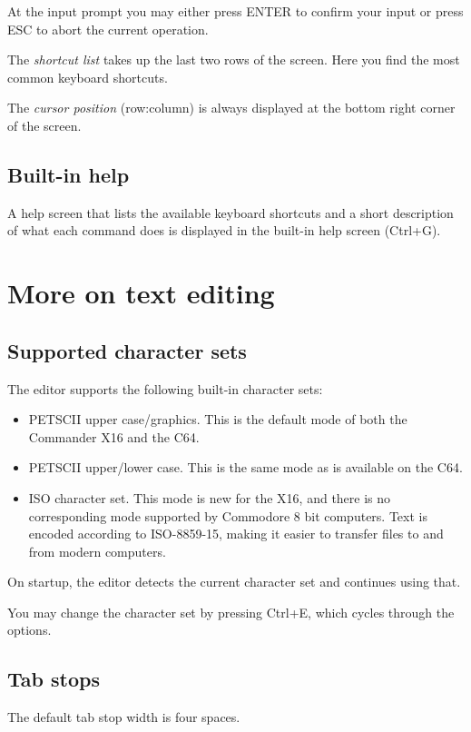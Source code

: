 \documentclass{article}
\begin{document}
        At the input prompt you may either press ENTER to confirm your input or press ESC 
        to abort the current operation.

        The \textit{shortcut list} takes up the last two rows of the screen. Here you find
        the most common keyboard shortcuts. 
        
        The \textit{cursor position} (row:column) is always displayed at the bottom right corner
        of the screen.

    \subsection{Built-in help}
        A help screen that lists the available keyboard shortcuts and a short description 
        of what each command does is displayed in the built-in help screen (Ctrl+G). 
    
\section{More on text editing}

    \subsection{Supported character sets}
        The editor supports the following built-in character sets:

        \begin{itemize}
            \item PETSCII upper case/graphics. This is the default mode of both the Commander X16 and the C64.

            \item PETSCII upper/lower case. This is the same mode as is available on the C64.

            \item ISO character set. This mode is new for the X16, and there is no corresponding mode 
            supported by Commodore 8 bit computers. Text is encoded according to ISO-8859-15, making it
            easier to transfer files to and from modern computers.
        \end{itemize}

        On startup, the editor detects the current character set and continues using that.

        You may change the character set by pressing Ctrl+E, which cycles through the options.

    \subsection{Tab stops}
        The default tab stop width is four spaces. 
        
\end{document}
